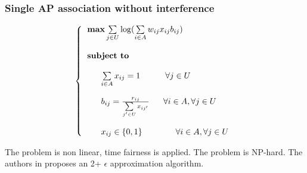 \documentclass[journal,transmag]{IEEEtran}
\begin{document}
\subsubsection{Single AP association without interference} 
\begin{footnotesize}
\begin{equation}
\left\{
\begin{tabular}{l}
$\textbf{max}  \sum\limits_{j \in U} \log ( \sum\limits_{i \in A} w_{ij} x_{ij} b_{ij}) $ \\         
\\
\textbf{subject to} \\
\\
~~~~~$ \sum\limits_{i \in A} x_{ij} = 1 ~~~~~~~~~ \forall j \in U $ \\ 

\\
~~~~~$ b_{ij} = \frac{r_{ij}}{\sum\limits_{j' \in U} x_{ij'}}$ ~~~ $\forall i \in A, \forall j \in U $  \\

\\
~~~~~$ x_{ij} \in \{0,1\} ~~~~~~~~~~~~ \forall i \in A, \forall j \in U $ \\

\end{tabular}
\right.
\end{equation}
\end{footnotesize}
The problem is non linear, time fairness is applied. The problem is NP-hard. The authors in \cite{08proportional_fairness_multiRate_LAN} proposes an 2+ $\epsilon$ approximation algorithm.
 
\end{document}
